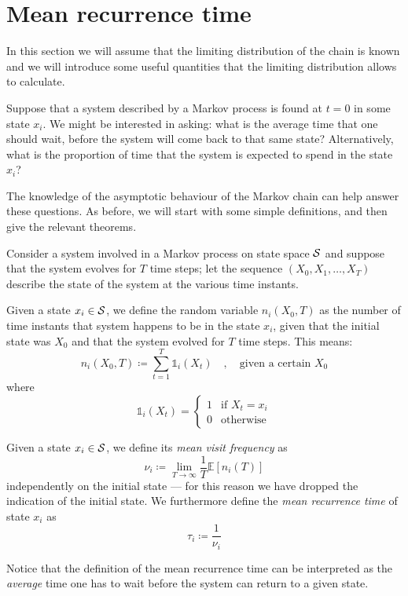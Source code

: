 \section{Mean recurrence time}
In this section we will assume that the limiting distribution of the chain is known and we will introduce some useful quantities that the limiting distribution allows to calculate.

Suppose that a system described by a Markov process is found at $t = 0$ in some state $x_i$. We might be interested in asking: what is the average time that one should wait, before the system will come back to that same state? Alternatively, what is the proportion of time that the system is expected to spend in the state $x_i$?

The knowledge of the asymptotic behaviour of the Markov chain can help answer these questions. As before, we will start with some simple definitions, and then give the relevant theorems.

\medskip
Consider a system involved in a Markov process on state space $\mathcal{S}$ and suppose that the system evolves for $T$ time steps; let the sequence $(X_0, X_1, \dots, X_T)$ describe the state of the system at the various time instants.
\begin{ndef} 
    Given a state $x_i \in \mathcal{S}$, we define the random variable $n_i (X_0, T)$ as the number of time instants that system happens to be in the state $x_i$, given that the initial state was $X_0$ and that the system evolved for $T$ time steps. This means:
    \begin{equation}
        n_i (X_0, T) \coloneqq \sum_{t = 1}^T \mathds{1}_i(X_t) \quad , \quad \text{given a certain }X_0
    \end{equation}
    where
    \begin{equation}
        \mathds{1}_i(X_t) =
        \begin{cases}
            1 & \text{if $X_t = x_i$} \\
            0 & \text{otherwise}
        \end{cases}
    \end{equation}
\end{ndef}
\begin{ndef}  \label{def:nu-tau}
    Given a state $x_i \in \mathcal{S}$, we define its \emph{mean visit frequency} as
    \begin{equation}
        \nu_i \coloneqq \lim_{T\rightarrow \infty} \frac{1}{T} \mathds{E} \left[ n_i (T) \right]
    \end{equation}
    independently on the initial state --- for this reason we have dropped the indication of the initial state.
    We furthermore define the \emph{mean recurrence time} of state $x_i$ as
    \begin{equation} \label{def:mean_rec_time}
        \tau_i \coloneqq \frac{1}{\nu_i}
    \end{equation}
\end{ndef}
Notice that the definition of the mean recurrence time can be interpreted as the \emph{average} time one has to wait before the system can return to a given state.

